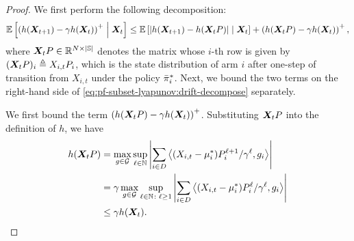 \begin{proof}
We first perform the following decomposition: 
\begin{equation}
    \label{eq:pf-subset-lyapunov:drift-decompose}
    \mathbb{E}\left[\left(h({\bm{X}}_{t+1})-\gamma h({\bm{X}}_t)\right)^+\;\middle|\;{\bm{X}}_t\right] \leq \mathbb{E}\left[\left\lvert h({\bm{X}}_{t+1})-h({\bm{X}}_tP)\right\rvert\;\middle|\;{\bm{X}}_t\right] + \left(h({\bm{X}}_tP)-\gamma h({\bm{X}}_t)\right)^+,
\end{equation}
where ${\bm{X}}_t P \in \mathbb{R}^{N\times \lvert\mathbb{S}\rvert}$ denotes the matrix whose $i$-th row is given by $({\bm{X}}_t P)_i \triangleq X_{i,t}P_i$, which is the state distribution of arm $i$ after one-step of transition from $X_{i,t}$ under the policy ${{\bar{\pi}}^*}_i$. 
Next, we bound the two terms on the right-hand side of \eqref{eq:pf-subset-lyapunov:drift-decompose} separately. 


We first bound the term $\left(h({\bm{X}}_tP)-\gamma h({\bm{X}}_t)\right)^+$. Substituting ${\bm{X}}_t P$ into the definition of $h$, we have
\begin{align*}
    h({\bm{X}}_tP) &= \max_{g\in \mathcal{G}}  \sup_{\ell\in\mathbb{N}} \left\lvert\sum_{i\in D} \left\langle (X_{i,t}-\mu_i^*)P_i^{\ell+1}/\gamma^{\ell}, g_i \right\rangle\right\rvert\\
    &=\gamma \max_{g\in \mathcal{G}}  \sup_{\ell\in\mathbb{N}\colon \ell \geq 1}  \left\lvert\sum_{i\in D} \left\langle (X_{i,t}-\mu_i^*)P_i^{\ell}/\gamma^{\ell}, g_i \right\rangle\right\rvert\\
    &\leq \gamma h({\bm{X}}_t).
\end{align*}


\end{proof}
